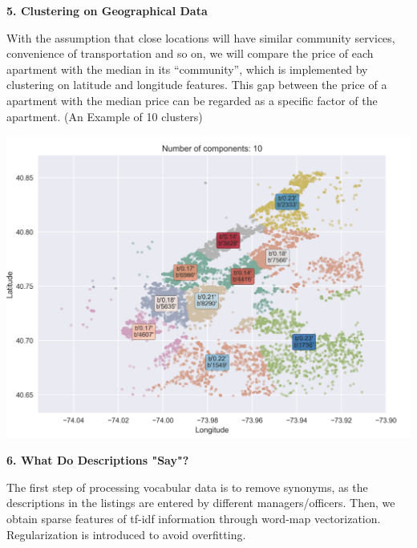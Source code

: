 \documentclass[landscape,final,a0paper,fontscale=0.285]{baposter}
\begin{document}
\begin{poster}
{\begin{multicols}{2}
\begin{multicols}{2}
  \end{multicols}

\noindent\textbf{5. Clustering on Geographical Data}\vspace{-0.5em}

  \begin{multicols}{2}
    With the assumption that close locations will have similar community services, convenience of transportation and so on, we will compare the price of each apartment with the median in its ``community'', which is implemented by clustering on latitude and longitude features. This gap between the price of a apartment with the median price can be regarded as a specific factor of the apartment.
    (An Example of 10 clusters)
    
    {\centering\includegraphics[width=0.99\linewidth]{images/cluster_10.png}}
  \end{multicols} 

\noindent\textbf{6. What Do Descriptions "Say"?}\vspace{0.2em}

  The first step of processing vocabular data %
  is to remove synonyms, as the descriptions in the listings are entered by different managers/officers. 
  Then, we obtain sparse features of tf-idf information through word-map vectorization. Regularization is introduced to avoid overfitting. 
  \vspace{0.2em} 
  
\end{multicols}
}

\end{poster}
\end{document}
